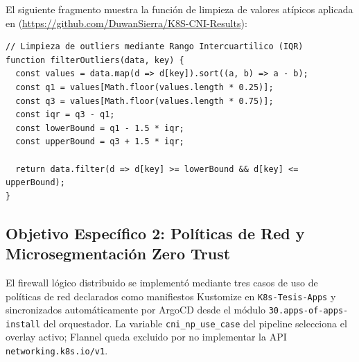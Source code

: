 El siguiente fragmento muestra la función de limpieza de valores
atípicos aplicada en
(\url{https://github.com/DuwanSierra/K8S-CNI-Results}):

\begin{lstlisting}
// Limpieza de outliers mediante Rango Intercuartilico (IQR)
function filterOutliers(data, key) {
  const values = data.map(d => d[key]).sort((a, b) => a - b);
  const q1 = values[Math.floor(values.length * 0.25)];
  const q3 = values[Math.floor(values.length * 0.75)];
  const iqr = q3 - q1;
  const lowerBound = q1 - 1.5 * iqr;
  const upperBound = q3 + 1.5 * iqr;

  return data.filter(d => d[key] >= lowerBound && d[key] <= upperBound);
}
\end{lstlisting}

\subsection{Objetivo Específico 2: Políticas de Red y Microsegmentación Zero
Trust}

El firewall lógico distribuido se implementó mediante tres casos de
uso de políticas de red declarados como manifiestos Kustomize en
\texttt{K8s-Tesis-Apps} y sincronizados automáticamente por ArgoCD
desde el módulo \texttt{30.apps-of-apps-install} del orquestador.
La variable \texttt{cni\_np\_use\_case} del pipeline selecciona el
overlay activo; Flannel queda excluido por no implementar la API
\texttt{networking.k8s.io/v1}.

